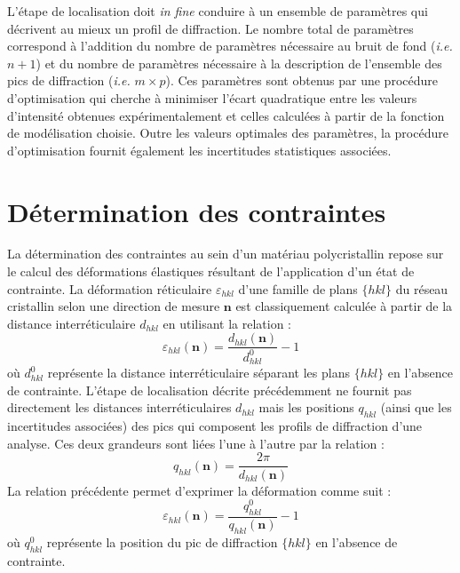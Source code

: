 \documentclass[french,a4paper]{report}
\begin{document}
L'étape de localisation doit \textit{in fine} conduire à un ensemble de paramètres qui décrivent au mieux un profil de diffraction. Le nombre total de paramètres correspond à l'addition du nombre de paramètres nécessaire au bruit de fond (\textit{i.e.} $n+1$) et du nombre de paramètres nécessaire à la description de l'ensemble des pics de diffraction (\textit{i.e.} $m \times p$). Ces paramètres sont obtenus par une procédure d'optimisation qui cherche à minimiser l'écart quadratique entre les valeurs d'intensité obtenues expérimentalement et celles calculées à partir de la fonction de modélisation choisie. Outre les valeurs optimales des paramètres, la procédure d'optimisation fournit également les incertitudes statistiques associées.

\section{Détermination des contraintes}

La détermination des contraintes au sein d'un matériau polycristallin repose sur le calcul des déformations élastiques résultant de l'application d'un état de contrainte. La déformation réticulaire $\varepsilon_{hkl}$ d'une famille de plans $\{hkl\}$ du réseau cristallin selon une direction de mesure $\boldsymbol n$ est classiquement calculée à partir de la distance interréticulaire $d_{hkl}$ en utilisant la relation :
\begin{equation}
\varepsilon_{hkl} (\boldsymbol n) = \frac{d_{hkl}(\boldsymbol n)}{d^0_{hkl}}-1
\end{equation}
où $d^0_{hkl}$ représente la distance interréticulaire séparant les plans $\{hkl\}$ en l'absence de contrainte. L'étape de localisation décrite précédemment ne fournit pas directement les distances interréticulaires $d_{hkl}$ mais les positions $q_{hkl}$ (ainsi que les incertitudes associées) des pics qui composent les profils de diffraction d'une analyse. Ces deux grandeurs sont liées l'une à l'autre par la relation :
\begin{equation}
q_{hkl} (\boldsymbol n) = \frac{2 \pi}{d_{hkl}(\boldsymbol n)}
\end{equation}
La relation précédente permet d'exprimer la déformation comme suit :
\begin{equation}
\varepsilon_{hkl} (\boldsymbol n) = \frac{q^0_{hkl}}{q_{hkl}(\boldsymbol n)}-1
\label{eq_strain_q}
\end{equation}
où $q^0_{hkl}$ représente la position du pic de diffraction $\{hkl\}$ en l'absence de contrainte.
\end{document}
